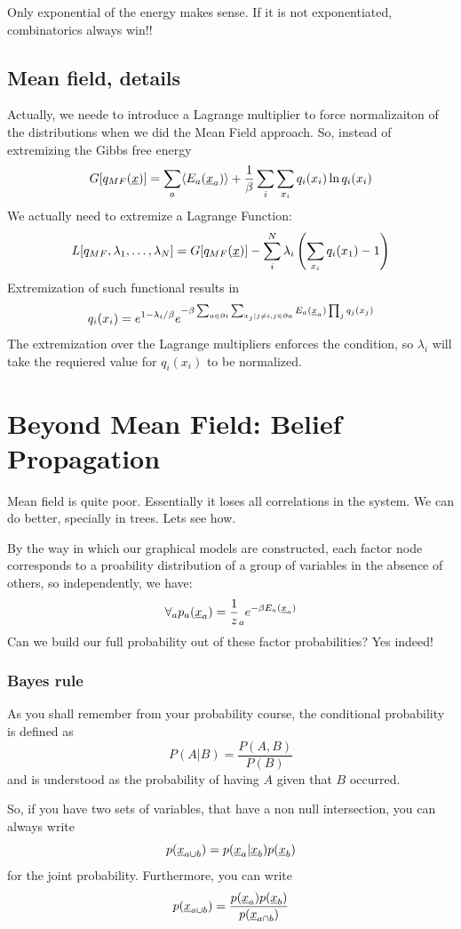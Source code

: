 Only exponential of the energy makes sense. If it is not exponentiated, combinatorics always win!!


\subsection*{Mean field, details}
Actually, we neede to introduce a Lagrange multiplier to force normalizaiton of the distributions when we did the Mean Field approach. So, instead of extremizing the Gibbs free energy
\[G[q_{MF}(\underline{x})] = \sum_a \langle E_a(\underline{x}_a)\rangle + \frac 1 \beta \sum_i \sum_{x_i} q_i(x_i) \ln q_i(x_i) \]
We actually need to extremize a Lagrange Function:
\[L[q_{MF},\lambda_1,\ldots,\lambda_N]  = G[q_{MF}(\underline{x})] -\sum_i^N \lambda_i \left(\sum_{x_i} q_i(x_1) - 1 \right)\]
Extremization of such functional results in
\[q_i(x_i) = e^{1-\lambda_i/\beta} e^{-\beta \sum_{a\in \partial i} \sum_{x_j|j\neq i, j\in\partial a} E_a(\underline{x}_a) \prod_j q_j(x_j)}\]
The extremization over the Lagrange multipliers enforces the condition, so $\lambda_i$ will take the requiered value for $q_i(x_i)$ to be normalized.

\section{Beyond Mean Field: Belief Propagation}

Mean field is quite poor. Essentially it loses all correlations in the system. We can do better, specially in trees. Lets see how.

By the way in which our graphical models are constructed, each factor node corresponds to a proability distribution of a group of variables in the absence of others, so independently, we have:
\[\forall_a p_a(\underline{x}_a) = \frac 1 z_a e^{-\beta E_a(\underline{x}_a)}\]
Can we build our full probability out of these factor probabilities? Yes indeed!

\subsubsection*{Bayes rule}

As you shall remember from your probability course, the conditional probability is defined as
\[P(A|B) = \frac{P(A,B)}{P(B)}\]
and is understood as the probability of having $A$ given that $B$ occurred.

So, if you have two sets of variables, that have a non null intersection, you can always write
\[ p(\underline{x}_{a\cup b}) = p(\underline{x}_a | \underline{x}_b) p(\underline{x}_b)\]
for the joint probability. Furthermore, you can write
\[ p(\underline{x}_{a\cup b}) =  \frac { p(\underline{x}_a ) p(\underline{x}_b)}{p(\underline{x}_{a\cap b})}\]

